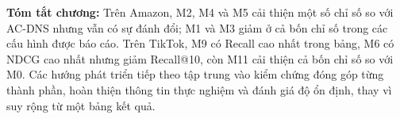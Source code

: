 \noindent \textbf{Tóm tắt chương:} Trên Amazon, M2, M4 và M5 cải thiện một số chỉ số so với AC-DNS nhưng vẫn có sự đánh đổi; M1 và M3 giảm ở cả bốn chỉ số trong các cấu hình được báo cáo. Trên TikTok, M9 có Recall cao nhất trong bảng, M6 có NDCG cao nhất nhưng giảm Recall@10, còn M11 cải thiện cả bốn chỉ số so với M0. Các hướng phát triển tiếp theo tập trung vào kiểm chứng đóng góp từng thành phần, hoàn thiện thông tin thực nghiệm và đánh giá độ ổn định, thay vì suy rộng từ một bảng kết quả.
